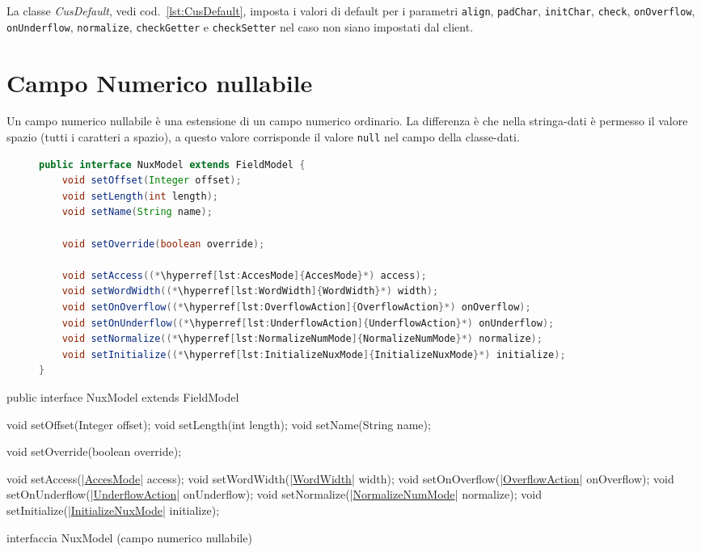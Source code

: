 La classe \textsl{CusDefault}, vedi cod.~\ref{lst:CusDefault}, imposta i valori
di default per i parametri \verb!align!, \verb!padChar!, \verb!initChar!, 
\verb!check!, \verb!onOverflow!, \verb!onUnderflow!, \verb!normalize!, 
\verb!checkGetter! e \verb!checkSetter! nel caso non siano  impostati dal 
client.


\section{Campo Numerico nullabile}
Un campo numerico nullabile è una estensione di un campo numerico ordinario.
La differenza è che nella stringa-dati è permesso il valore spazio (tutti i
caratteri a spazio), a questo valore corrisponde il valore \verb!null! nel 
campo della classe-dati.

\ifesource
\begin{figure*}[!htb]
\begin{lstlisting}[language=java, 
caption=interfaccia NuxModel (campo numerico nullabile), 
label=lst:NuxModel]
public interface NuxModel extends FieldModel {
    void setOffset(Integer offset);
    void setLength(int length);
    void setName(String name);

    void setOverride(boolean override);

    void setAccess((*\hyperref[lst:AccesMode]{AccesMode}*) access);
    void setWordWidth((*\hyperref[lst:WordWidth]{WordWidth}*) width);
    void setOnOverflow((*\hyperref[lst:OverflowAction]{OverflowAction}*) onOverflow);
    void setOnUnderflow((*\hyperref[lst:UnderflowAction]{UnderflowAction}*) onUnderflow);
    void setNormalize((*\hyperref[lst:NormalizeNumMode]{NormalizeNumMode}*) normalize);
    void setInitialize((*\hyperref[lst:InitializeNuxMode]{InitializeNuxMode}*) initialize);
}
\end{lstlisting}
\end{figure*}
\else
\begin{elisting}[!htb]
\begin{javacode}
public interface NuxModel extends FieldModel {
    void setOffset(Integer offset);
    void setLength(int length);
    void setName(String name);

    void setOverride(boolean override);

    void setAccess(|\hyperref[lst:AccesMode]{AccesMode}| access);
    void setWordWidth(|\hyperref[lst:WordWidth]{WordWidth}| width);
    void setOnOverflow(|\hyperref[lst:OverflowAction]{OverflowAction}| onOverflow);
    void setOnUnderflow(|\hyperref[lst:UnderflowAction]{UnderflowAction}| onUnderflow);
    void setNormalize(|\hyperref[lst:NormalizeNumMode]{NormalizeNumMode}| normalize);
    void setInitialize(|\hyperref[lst:InitializeNuxMode]{InitializeNuxMode}| initialize);
}
\end{javacode}
\caption{interfaccia NuxModel (campo numerico nullabile)}
\label{lst:NuxModel}
\end{elisting}
\fi


